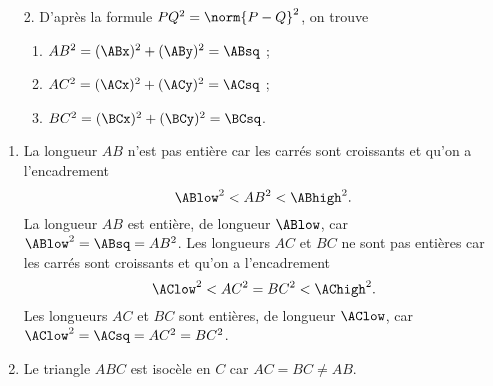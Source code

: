 {
	\begin{multicols}{2}
	\begin{enumerate}		
		\item[]
		\begin{center}
		\end{center}
		\item[2.]
		D'après la formule $PQ^2 = \norm{P-Q}^2$, on trouve
		\begin{enumerate}[label=\alph*)]
			\item $AB^2 = (\ABx)^2 + (\ABy)^2 = \ABsq$ ;
			\item $AC^2 = (\ACx)^2 + (\ACy)^2 = \ACsq$ ;
			\item $BC^2 = (\BCx)^2 + (\BCy)^2 = \BCsq$.
		\end{enumerate}
	\end{enumerate}
	\end{multicols}
	\begin{enumerate}\addtocounter{enumi}{2}
		\item
			\ifnum{}
			La longueur $AB$ n'est pas entière car les carrés sont croissants et qu'on a l'encadrement
				\[ \ABlow^2 < AB^2 < \ABhigh^2. \]
			\else
			La longueur $AB$ est entière, de longueur $\ABlow$, car $\ABlow^2 = \ABsq = AB^2$.
			\fi
			\ifnum{}
			Les longueurs $AC$ et $BC$ ne sont pas entières car les carrés sont croissants et qu'on a l'encadrement
				\[ \AClow^2 < AC^2 = BC^2 < \AChigh^2. \]
			\else
			Les longueurs $AC$ et $BC$ sont entières, de longueur $\AClow$, car $\AClow^2 = \ACsq = AC^2 = BC^2$.
			\fi
		\item
		Le triangle $ABC$ est isocèle en $C$ car $AC = BC \neq AB$.
	\end{enumerate}
}


\newpage
{}
\shipoutAnswer




